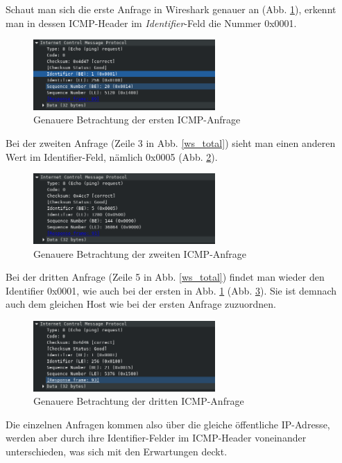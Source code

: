 \documentclass[11pt, a4paper]{article}
\begin{document}
Schaut man sich die erste Anfrage in Wireshark genauer an (Abb. \ref{z_first_req}),
erkennt man in dessen ICMP-Header im \emph{Identifier}-Feld die Nummer 0x0001.

\begin{figure}[H]
  \centering
  \includegraphics[width=0.618\textwidth]
  {graphics/bilder/zusatz/first_req}
  \caption{Genauere Betrachtung der ersten ICMP-Anfrage}\label{z_first_req}
\end{figure}

Bei der zweiten Anfrage (Zeile 3 in Abb. \ref{ws_total}) sieht man einen anderen Wert im Identifier-Feld, nämlich 0x0005 (Abb. \ref{z_second_req}).

\begin{figure}[H]
  \centering
  \includegraphics[width=0.618\textwidth]
  {graphics/bilder/zusatz/second_req}
  \caption{Genauere Betrachtung der zweiten ICMP-Anfrage}\label{z_second_req}
\end{figure}

Bei der dritten Anfrage (Zeile 5 in Abb. \ref{ws_total}) findet man wieder den Identifier 0x0001, wie auch bei der ersten in Abb. \ref{z_first_req} (Abb. \ref{z_third_req}). Sie ist demnach auch dem gleichen Host wie bei der ersten Anfrage zuzuordnen.

\begin{figure}[H]
  \centering
  \includegraphics[width=0.618\textwidth]
  {graphics/bilder/zusatz/third_req}
  \caption{Genauere Betrachtung der dritten ICMP-Anfrage}\label{z_third_req}
\end{figure}

Die einzelnen Anfragen kommen also über die gleiche öffentliche IP-Adresse, werden aber durch ihre Identifier-Felder im ICMP-Header voneinander unterschieden, was sich mit den Erwartungen deckt.
\end{document}
